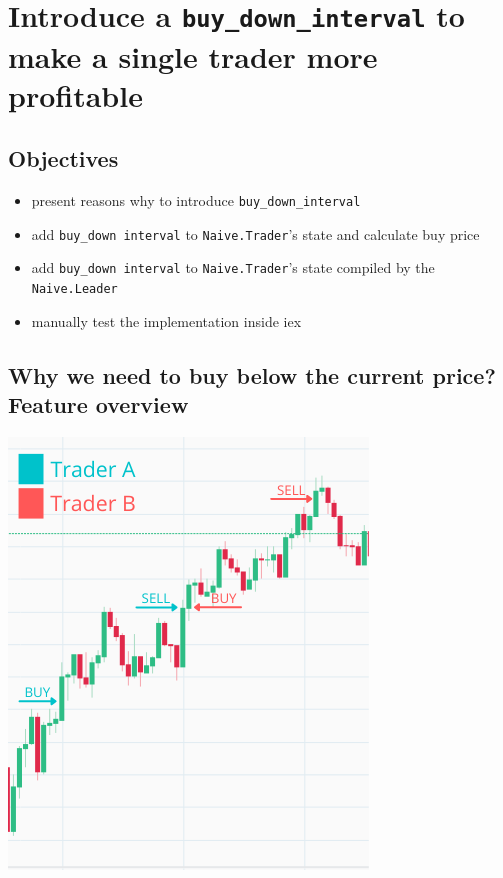 \documentclass[
  oneside]{book}
\providecommand{\tightlist}{%
  \setlength{\itemsep}{0pt}\setlength{\parskip}{0pt}}
\begin{document}
\chapter{\texorpdfstring{Introduce a \texttt{buy\_down\_interval} to make a single trader more profitable}{Introduce a buy\_down\_interval to make a single trader more profitable}}\label{introduce-a-buy_down_interval-to-make-a-single-trader-more-profitable}

\section{Objectives}\label{objectives-5}

\begin{itemize}
\tightlist
\item
  present reasons why to introduce \texttt{buy\_down\_interval}
\item
  add \texttt{buy\_down\ interval} to \texttt{Naive.Trader}'s state and calculate buy price
\item
  add \texttt{buy\_down\ interval} to \texttt{Naive.Trader}'s state compiled by the \texttt{Naive.Leader}
\item
  manually test the implementation inside iex
\end{itemize}

\section{Why we need to buy below the current price? Feature overview}\label{why-we-need-to-buy-below-the-current-price-feature-overview}

\begin{center}\includegraphics[width=0.5\linewidth]{images/chapter_06_01_current_buy_price} \end{center}
\end{document}

